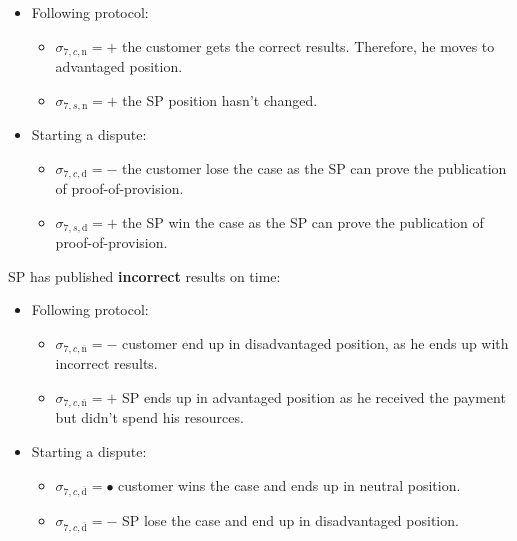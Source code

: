 \documentclass{ieeeaccess}
\begin{document}
\begin{itemize}
\item
  Following protocol:

  \begin{itemize}
  
  \item
    \(\sigma_{7, c, \mathrm{n}} = +\) the customer gets the correct
    results. Therefore, he moves to advantaged position.
  \item
    \(\sigma_{7, s, \mathrm{n}} = +\) the SP position hasn't changed.
  \end{itemize}
\item
  Starting a dispute:

  \begin{itemize}
  
  \item
    \(\sigma_{7, c, \mathrm{d}} = -\) the customer lose the case as the
    SP can prove the publication of proof-of-provision.
  \item
    \(\sigma_{7, s, \mathrm{d}} = +\) the SP win the case as the SP can
    prove the publication of proof-of-provision.
  \end{itemize}
\end{itemize}

SP has published \textbf{incorrect} results on time:

\begin{itemize}
\item
  Following protocol:

  \begin{itemize}
  
  \item
    \(\sigma_{7, c, \overline{\mathrm{n}}} = -\) customer end up in disadvantaged position, as he ends up with incorrect results.
  \item
    \(\sigma_{7, c, \overline{\mathrm{n}}} = +\) SP ends up in advantaged
    position as he received the payment but didn't spend his resources.
  \end{itemize}
\item
  Starting a dispute:

  \begin{itemize}
  
  \item
    \(\sigma_{7, c, \overline{\mathrm{d}}} = •\) customer wins the case and ends up in neutral position.
  \item
    \(\sigma_{7, c, \overline{\mathrm{d}}} = -\) SP lose the case and end up in disadvantaged position.
  \end{itemize}
\end{itemize}
\end{document}
